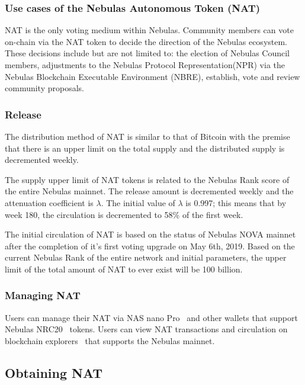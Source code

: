 \subsubsection{Use cases of the Nebulas Autonomous Token (NAT)}


NAT is the only voting medium within Nebulas. Community members can vote on-chain via the NAT token to decide the direction of the Nebulas ecosystem. These decisions include but are not limited to: the election of Nebulas Council members, adjustments to the Nebulas Protocol Representation(NPR) via the Nebulas Blockchain Executable Environment (NBRE), establish, vote and review community proposals.

\subsubsection{Release}

The distribution method of NAT is similar to that of Bitcoin with the premise that there is an upper limit on the total supply and the distributed supply is decremented weekly.

The supply upper limit of NAT tokens is related to the Nebulas Rank score of
the entire Nebulas mainnet. The release amount is decremented weekly and the
attenuation coefficient is $\lambda$. The initial value of $\lambda$ is 0.997; this means that by week 180, the circulation is decremented to 58\% of the first week.

The initial circulation of NAT is based on the status of Nebulas NOVA mainnet after the completion of it's first voting upgrade on May 6th, 2019. Based on the current Nebulas Rank of the entire network and initial parameters, the upper limit of the total amount of NAT to ever exist will be 100 billion.

\subsubsection{Managing NAT}

Users can manage their NAT via NAS nano Pro~\cite{NASnano} and other wallets that support Nebulas NRC20~\cite{wallets} tokens. Users can view NAT transactions and circulation on blockchain explorers~\cite{explorer} that supports the Nebulas mainnet.

\subsection{Obtaining NAT}

